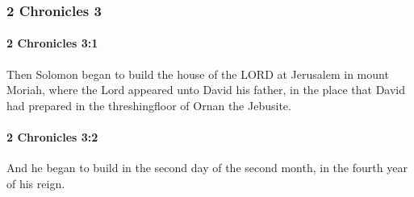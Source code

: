 	\subsubsection{2 Chronicles 3} %
		\label{2CHRONICLES-3}

		\paragraph{2 Chronicles 3:1} %
			\label{2CHRONICLES-3-1}

			Then Solomon began to build the house of the LORD at Jerusalem in mount Moriah, where the Lord appeared unto David his father, in the place that David had prepared in the threshingfloor of Ornan the Jebusite.


		\paragraph{2 Chronicles 3:2} %
			\label{2CHRONICLES-3-2}

			And he began to build in the second day of the second month, in the fourth year of his reign.

